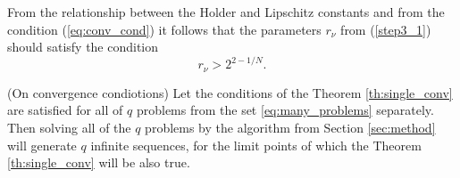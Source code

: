 \documentclass[runningheads]{llncs}
\begin{document}
\begin{remark}
  \label{rem:r1}
  From the relationship between the Holder and Lipschitz constants and from the condition (\ref{eq:conv_cond}) it follows
  that the parameters \(r_\nu\) from (\ref{step3_1}) should satisfy the condition
  \begin{equation}
    r_\nu > 2^{2 - 1/N}.
  \end{equation}
\end{remark}

\begin{theorem} (On convergence condiotions) Let the conditions of the Theorem \ref{th:single_conv}
  are satisfied for all of \(q\) problems from the set \ref{eq:many_problems} separately.
  Then solving all of the \(q\) problems by the algorithm from Section \ref{sec:method} will
  generate \(q\) infinite sequences, for the limit points of which the Theorem \ref{th:single_conv}
  will be also true.
\end{theorem}
\end{document}
